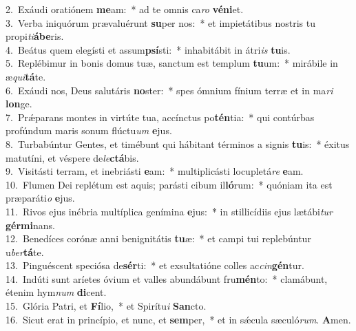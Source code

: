 {2.~}Exáudi oratiónem \textbf{me}am:~* ad te omnis ca\textit{ro} \textbf{vé}\textbf{ni}et.\\
{3.~}Verba iniquórum prævaluérunt \textbf{su}per nos:~* et impietátibus nostris tu propi\textit{ti}\textbf{á}\textbf{be}ris.\\
{4.~}Beátus quem elegísti et assum\textbf{psí}sti:~* inhabitábit in átri\textit{is} \textbf{tu}is.\\
{5.~}Replébimur in bonis domus tuæ, sanctum est templum \textbf{tu}um:~* mirábile in æ\textit{qui}\textbf{tá}te.\\
{6.~}Exáudi nos, Deus salutáris \textbf{no}ster:~* spes ómnium fínium terræ et in ma\textit{ri} \textbf{lon}ge.\\
{7.~}Prǽparans montes in virtúte tua, accínctus po\textbf{tén}tia:~* qui contúrbas profúndum maris sonum flúctu\textit{um} \textbf{e}jus.\\
{8.~}Turbabúntur Gentes, et timébunt qui hábitant términos a signis \textbf{tu}is:~* éxitus matutíni, et véspere de\textit{le}\textbf{ctá}bis.\\
{9.~}Visitásti terram, et inebriásti \textbf{e}am:~* multiplicásti locupletá\textit{re} \textbf{e}am.\\
{10.~}Flumen Dei replétum est aquis; parásti cibum il\textbf{ló}rum:~* quóniam ita est præparáti\textit{o} \textbf{e}jus.\\
{11.~}Rivos ejus inébria multíplica genímina \textbf{e}jus:~* in stillicídiis ejus lætábi\textit{tur} \textbf{gér}\textbf{mi}nans.\\
{12.~}Benedíces corónæ anni benignitátis \textbf{tu}æ:~* et campi tui replebúntur u\textit{ber}\textbf{tá}te.\\
{13.~}Pinguéscent speciósa de\textbf{sér}ti:~* et exsultatióne colles ac\textit{cin}\textbf{gén}tur.\\
{14.~}Indúti sunt aríetes óvium et valles abundábunt fru\textbf{mén}to:~* clamábunt, étenim hym\textit{num} \textbf{di}cent.\\
{15.~}Glória Patri, et \textbf{Fí}lio,~* et Spirítu\textit{i} \textbf{San}cto.\\
{16.~}Sicut erat in princípio, et nunc, et \textbf{sem}per,~* et in sǽcula sæculó\textit{rum}. \textbf{A}men.\\
